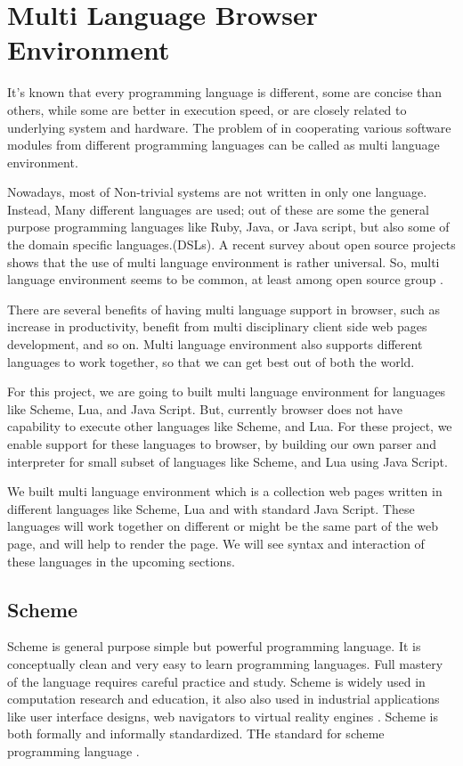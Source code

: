 \section{Multi Language Browser Environment} 

It's known that every programming language is different, some are concise than others, while some are better in execution speed, or are closely related to underlying system and hardware. The problem of in cooperating various software modules from different programming languages can be called as multi language environment.

Nowadays, most of Non-trivial systems are not written in only one language.
Instead, Many different languages are used; out of these are some the general purpose programming languages like Ruby, Java, or Java script, but also some of the domain specific languages.(DSLs). A recent survey about open source projects shows that the use of multi language environment is rather universal. So, multi language environment seems to be common, at least among open source group \cite{Mayer2017}.

There are several benefits of having multi language support in browser, such as increase in productivity, benefit from multi disciplinary client side web pages development, and so on. Multi language environment also supports different languages to work together, so that we can get best out of both the world.

For this project, we are going to built multi language environment for languages like Scheme, Lua, and Java Script. But, currently browser does not have capability to execute other languages like Scheme, and Lua. For these project, we enable support for these languages to browser, by building our own parser and interpreter for small subset of languages like Scheme, and Lua using Java Script. 

We built multi language environment which is a collection web pages written in different languages like Scheme, Lua and with standard Java Script. These languages will work together on different or might be the same part of the web page, and will help to render the page. We will see syntax and interaction of these languages in the upcoming sections. 


\subsection{Scheme}

Scheme is general purpose simple but powerful programming language.
It is conceptually clean and very easy to learn programming languages. Full mastery of the language requires careful practice and study. Scheme is widely used in computation research and education, it also also used in industrial applications like user interface designs, web navigators to virtual reality engines \cite{Dybvig:1996:SPL:525334}. Scheme is both formally and informally standardized. THe standard for scheme programming language \cite{schemeieee}.

